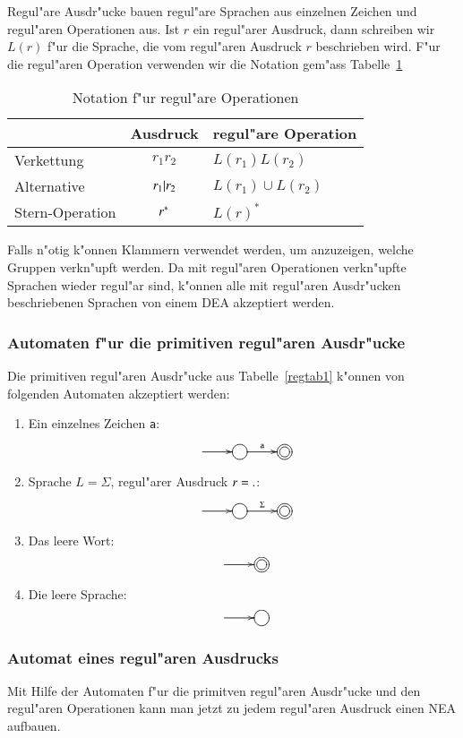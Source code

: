 Regul"are Ausdr"ucke bauen regul"are Sprachen aus einzelnen
Zeichen und regul"aren Operationen aus.
Ist $r$ ein regul"arer Ausdruck, dann schreiben wir  $L(r)$ f"ur die
Sprache, die vom regul"aren Ausdruck $r$ beschrieben wird.
F"ur die regul"aren Operation verwenden wir die Notation
gem"ass Tabelle~\ref{regtab2}
\begin{table}
\begin{center}
\begin{tabular}{|l|c|l|}
\hline
&Ausdruck&regul"are Operation\\
\hline
\index{Verkettung}
Verkettung&$r_1r_2$&$L(r_1)L(r_2)$\\
\index{Alternative}
Alternative&$r_1{\tt |}r_2$&$L(r_1)\cup L(r_2)$\\
\index{*-Operation@$*$-Operation}
Stern-Operation&$r{\mathstrut^{\tt *}}$&$L(r)^*$\\
\hline
\end{tabular}
\end{center}
\caption{Notation f"ur regul"are Operationen\label{regtab2}}
\end{table}
Falls n"otig k"onnen Klammern verwendet werden, um anzuzeigen,
welche Gruppen verkn"upft werden. Da mit regul"aren Operationen
verkn"upfte Sprachen wieder regul"ar sind, k"onnen alle mit
regul"aren Ausdr"ucken beschriebenen Sprachen von einem DEA
akzeptiert werden.

\subsubsection{Automaten f"ur die primitiven regul"aren Ausdr"ucke}
Die primitiven regul"aren Ausdr"ucke aus Tabelle~\ref{regtab1} k"onnen
von folgenden Automaten akzeptiert werden:
\begin{enumerate}
\item Ein einzelnes Zeichen {\tt a}:
\[
\entrymodifiers={++[o][F]}
\xymatrix{
*+\txt{}\ar[r]
	&{}\ar[r]^{\tt a}
		&*++[o][F=]{}
}
\]
\item Sprache $L=\Sigma$, regul"arer Ausdruck $r={\tt .}$:
\[
\entrymodifiers={++[o][F]}
\xymatrix{
*+\txt{}\ar[r]
	&{}\ar[r]^{\Sigma}
		&*++[o][F=]{}
}
\]
\item Das leere Wort:
\[
\entrymodifiers={++[o][F]}
\xymatrix{
*+\txt{}\ar[r]
	&*++[o][F=]{}
}
\]
\item Die leere Sprache:
\[
\entrymodifiers={++[o][F]}
\xymatrix{
*+\txt{}\ar[r]
	&{}
}
\]
\end{enumerate}

\subsubsection{Automat eines regul"aren Ausdrucks}
Mit Hilfe der Automaten f"ur die primitven regul"aren Ausdr"ucke
und den regul"aren Operationen kann man jetzt zu jedem regul"aren
Ausdruck einen NEA aufbauen.

